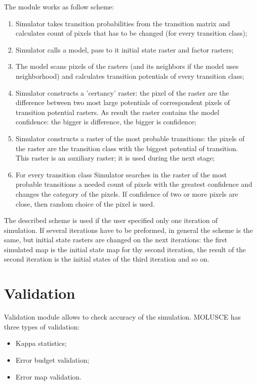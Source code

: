 \documentclass{report}
\begin{document}
The module works as follow scheme:
\begin{enumerate}
    \item Simulator takes transition probabilities from the transition matrix and calculates count of pixels that has to be changed (for every transition class);
    \item Simulator calls a model, pass to it initial state raster and factor rasters;
    \item The model scans pixels of the rasters (and its neighbors if the model uses neighborhood) and calculates transition potentials of every transition class;
    \item Simulator constructs a 'certancy' raster: the pixel of the raster are the difference between two most large potentials of correspondent pixels of transition potential rasters. As result the raster contains the model confidence: the bigger is difference, the bigger is confidence;
    \item Simulator constructs a raster of the most probable transitions: the pixels of the raster are the transition class with the biggest potential of transition. This raster is an auxiliary raster; it is used during the next stage;
    \item For every transition class Simulator searches in the raster of the most probable transitions a needed count of pixels with the greatest confidence and changes the category of the pixels. If confidence of two or more pixels are close, then random choice of the pixel is used.
\end{enumerate}

The described scheme is used if the user specified only one iteration of simulation. If several iterations have to be preformed, in general the scheme is the same, but initial state rasters are changed on the next iterations: the first simulated map is the initial state map for thy second iteration, the result of the second iteration is the initial states of the third iteration and so on. 


\section{Validation}\label{sec:validation}

Validation module allows to check accuracy of the simulation. MOLUSCE has three types of validation:
\begin{itemize}
    \item Kappa statistics;
    \item Error budget validation;
    \item Error map validation.
\end{itemize}
\end{document}
